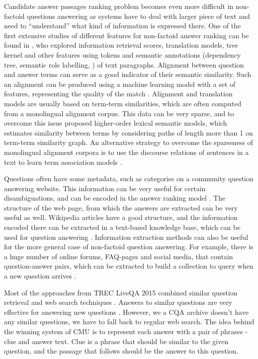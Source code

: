 Candidate answer passages ranking problem becomes even more difficult in non-factoid questions answering as systems have to deal with larger piece of text and need to ``understand'' what kind of information is expressed there.
One of the first extensive studies of different features for non-factoid answer ranking can be found in \cite{surdeanu2011learning}, who explored information retrieval scores, translation models, tree kernel and other features using tokens and semantic annotations (dependency tree, semantic role labelling, \etc) of text paragraphs.
Alignment between question and answer terms can serve as a good indicator of their semantic similarity.
Such an alignment can be produced using a machine learning model with a set of features, representing the quality of the match \cite{wang2015faq}.
Alignment and translation models are usually based on term-term similarities, which are often computed from a monolingual alignment corpus.
This data can be very sparse, and to overcome this issue \cite{fried2015higher} proposed higher-order lexical semantic models, which estimates similarity between terms by considering paths of length more than 1 on term-term similarity graph.
An alternative strategy to overcome the sparseness of monolingual alignment corpora is to use the discourse relations of sentences in a text to learn term association models \cite{sharp2015spinning}.

Questions often have some metadata, such as categories on a community question answering website.
This information can be very useful for certain disambiguations, and can be encoded in the answer ranking model \cite{zhou2015learning}.
The structure of the web page, from which the answers are extracted can be very useful as well.
Wikipedia articles have a good structure, and the information encoded there can be extracted in a text-based knowledge base, which can be used for question answering \cite{sondhi2014mining}.
Information extraction methods can also be useful for the more general case of non-factoid question answering.
For example, there is a huge number of online forums, FAQ-pages and social media, that contain question-answer pairs, which can be extracted to build a collection to query when a new question arrives \cite{cong2008finding,Jijkoun:2005:RAF:1099554.1099571,Yang:2009:ISK:1526709.1526735,ding2008using,li2011question}.

Most of the approaches from TREC LiveQA 2015 combined similar question retrieval and web search techniques \cite{ecnucs_liveqa15,savenkov_liveqa15,diwang_liveqa15}.
Answers to similar questions are very effective for answering new questions \cite{savenkov_liveqa15}.
However, we a CQA archive doesn't have any similar questions, we have to fall back to regular web search.
The idea behind the winning system of CMU \cite{diwang_liveqa15} is to represent each answer with a pair of phrases - clue and answer text.
Clue is a phrase that should be similar to the given question, and the passage that follows should be the answer to this question.

